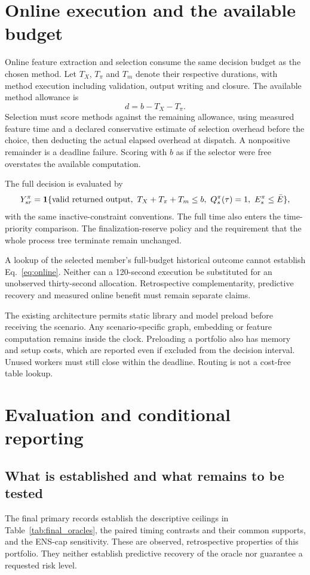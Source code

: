 \section{Online execution and the available budget}
Online feature extraction and selection consume the same decision budget as
the chosen method. Let $T_X$, $T_\pi$ and $T_m$ denote their respective
durations, with method execution including validation, output writing and
closure. The available method allowance is
\begin{equation}
 d=b-T_X-T_\pi .
\end{equation}
Selection must score methods against the remaining allowance, using measured
feature time and a declared conservative estimate of selection overhead
before the choice, then deducting the actual elapsed overhead at dispatch.
A nonpositive remainder is a deadline failure. Scoring with $b$ as if the
selector were free overstates the available computation.

The full decision is evaluated by
\begin{equation}
 Y^\pi_{sr}=\mathbf{1}\{\text{valid returned output},\
 T_X+T_\pi+T_m\leq b,\
 Q^\pi_s(\tau)=1,\
 E^\pi_s\leq\bar E\},
 \label{eq:online}
\end{equation}
with the same inactive-constraint conventions. The full time also enters the
time-priority comparison. The finalization-reserve policy and the requirement
that the whole process tree terminate remain unchanged.

A lookup of the selected member's full-budget historical outcome cannot
establish Eq.~\eqref{eq:online}. Neither can a 120-second execution be
substituted for an unobserved thirty-second allocation. Retrospective
complementarity, predictive recovery and measured online benefit must remain
separate claims.

The existing architecture permits static library and model preload before
receiving the scenario. Any scenario-specific graph, embedding or feature
computation remains inside the clock. Preloading a portfolio also has memory
and setup costs, which are reported even if excluded from the decision
interval. Unused workers must still close within the deadline. Routing is
not a cost-free table lookup.

\section{Evaluation and conditional reporting}
\subsection{What is established and what remains to be tested}
The final primary records establish the descriptive ceilings in
Table~\ref{tab:final_oracles}, the paired timing contrasts and their common
supports, and the ENS-cap sensitivity. These are observed, retrospective
properties of this portfolio. They neither establish predictive recovery of
the oracle nor guarantee a requested risk level.

